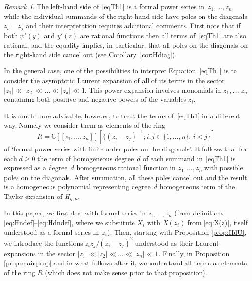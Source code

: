 \documentclass[JEP,XML,SOM,Unicode,NoEqCountersInSection,NoFloatCountersInSection]{cedram}
\newcommand{\llbracket}{[\![}
\newcommand{\rrbracket}{]\!]}
\theoremstyle{plain}
\theoremstyle{definition}
\theoremstyle{remark}
\newtheorem{remark}[theorem]{Remark}
\begin{document}
\begin{remark}
The left-hand side of~\eqref{eqTh1} is a formal power series in~$z_1,\dots,z_n$ while the individual summands of the right-hand side have poles on the diagonals $z_i=z_j$ and their interpretation requires additional comments. First note that if both $\psi'(y)$ and $y'(z)$ are rational functions then all terms of~\eqref{eqTh1} are also rational, and the equality implies, in particular, that all poles on the diagonals on the right-hand side cancel out (see Corollary~\ref{cor:Hdiag}).

In the general case, one of the possibilities to interpret Equation~\eqref{eqTh1} is to consider the asymptotic Laurent expansion of all of its terms in the sector $|z_1|\ll |z_2|\ll\dots\ll |z_n|\ll 1$. This power expansion involves monomials in $z_1,\dots, z_n$ containing both positive and negative powers of the variables $z_i$.

It is much more advisable, however, to treat the terms of~\eqref{eqTh1} in a different way. Namely we consider them as elements of the ring
\[
R=\mathbb{C}\llbracket z_1,\dots,z_n\rrbracket [\{(z_i-z_j)^{-1}; i,j\in\{1,\ldots,n\},\,i<j\}]
\]
of `formal power series with finite order poles on the diagonals'. It follows that for each $d\ge0$ the term of homogeneous degree~$d$ of each summand in~\eqref{eqTh1} is expressed as a degree~$d$ homogeneous rational function in $z_1,\dots,z_n$ with possible poles on the diagonals. After summation, all these poles cancel out and the result is a homogeneous polynomial representing degree~$d$ homogeneous term of the Taylor expansion of $H_{g,n}$.

In this paper, we first deal with formal series in $z_1,\dots, z_n$ (from definitions \hbox{\eqref{eq:Hndef}--\eqref{eq:Hdndef}}, where we substitute $X_i$ with $X(z_i)$ from \eqref{eq:X(z)}, itself understood as a formal series in~$z_i$). Then, starting with Proposition \ref{prop:HdU}, we introduce the functions $z_iz_j/(z_i-z_j)^2$ understood as their Laurent expansions in the sector $|z_1|\ll |z_2|\ll\dots\ll |z_n|\ll 1$. Finally, in Proposition \ref{prop:mainprop} and in what follows after it, we understand all terms as elements of the ring $R$ (which does not make sense prior to that proposition).
\end{remark}

\end{document}
